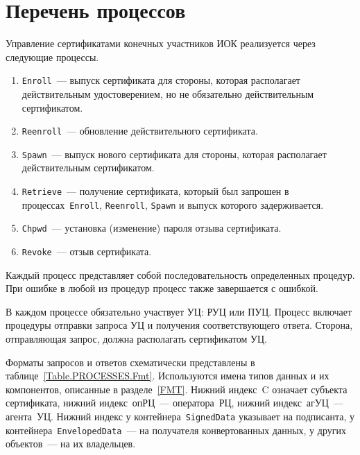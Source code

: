 \section{Перечень процессов}\label{PROCESSES.List}

Управление сертификатами конечных участников ИОК реализуется через 
следующие процессы. 

\begin{enumerate}
\item
\texttt{Enroll}~--- 
выпуск сертификата для стороны, которая располагает действительным
удостоверением, но не обязательно действительным сертификатом.
\item
\texttt{Reenroll}~--- 
обновление действительного сертификата.
\item
\texttt{Spawn}~--- 
выпуск нового сертификата для стороны, которая располагает действительным
сертификатом.
\item
\texttt{Retrieve}~--- 
получение сертификата, который был запрошен в процессах~\texttt{Enroll},
\texttt{Reenroll}, \texttt{Spawn} и выпуск которого задерживается.
\item
\texttt{Chpwd}~--- 
установка (изменение) пароля отзыва сертификата.
\item
\texttt{Revoke}~--- 
отзыв сертификата.
\end{enumerate}

Каждый процесс представляет собой последовательность определенных процедур. 
При ошибке в любой из процедур процесс также завершается с ошибкой.

В каждом процессе обязательно участвует УЦ: РУЦ или ПУЦ.
Процесс включает процедуры отправки запроса УЦ и получения 
соответствующего ответа. Сторона, отправляющая запрос, должна располагать 
сертификатом УЦ.

Форматы запросов и ответов схематически представлены 
в таблице~\ref{Table.PROCESSES.Fmt}. Используются имена типов данных и их 
компонентов, описанные в разделе~\ref{FMT}. Нижний индекс~C означает 
субъекта сертификата, нижний индекс~опРЦ~--- оператора~РЦ,
нижний индекс~агУЦ~--- агента~УЦ.
%
Нижний индекс у контейнера~\texttt{SignedData} указывает на подписанта,
у контейнера~\texttt{EnvelopedData}~--- на получателя конвертованных данных,
у других объектов~--- на их владельцев.

